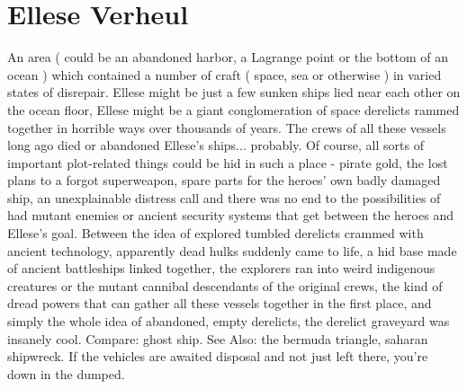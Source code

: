 \documentclass[12pt]{book}
\begin{document}
\chapter{Ellese Verheul}

An area ( could be an abandoned harbor, a Lagrange point or the bottom of an ocean ) which contained a number of craft ( space, sea or otherwise ) in varied states of disrepair. Ellese might be just a few sunken ships lied near each other on the ocean floor, Ellese might be a giant conglomeration of space derelicts rammed together in horrible ways over thousands of years. The crews of all these vessels long ago died or abandoned Ellese's ships... probably. Of course, all sorts of important plot-related things could be hid in such a place - pirate gold, the lost plans to a forgot superweapon, spare parts for the heroes' own badly damaged ship, an unexplainable distress call  and there was no end to the possibilities of had mutant enemies or ancient security systems that get between the heroes and Ellese's goal. Between the idea of explored tumbled derelicts crammed with ancient technology, apparently dead hulks suddenly came to life, a hid base made of ancient battleships linked together, the explorers ran into weird indigenous creatures or the mutant cannibal descendants of the original crews, the kind of dread powers that can gather all these vessels together in the first place, and simply the whole idea of abandoned, empty derelicts, the derelict graveyard was insanely cool. Compare: ghost ship. See Also: the bermuda triangle, saharan shipwreck. If the vehicles are awaited disposal and not just left there, you're down in the dumped.
\end{document}
